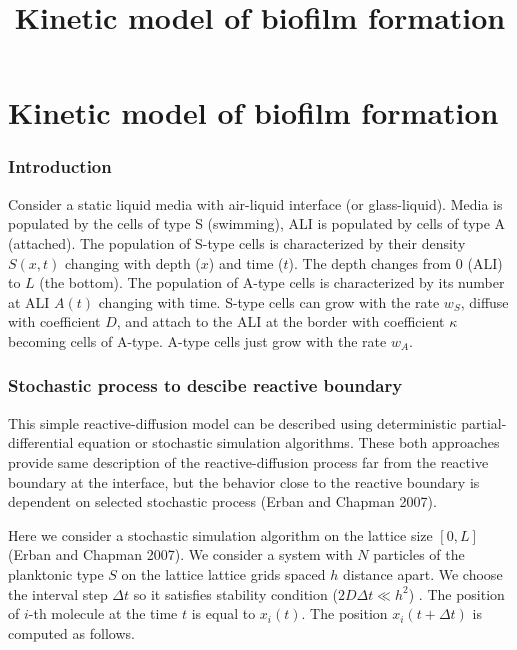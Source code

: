 \documentclass[10pt, oneside]{article}
\title {Kinetic model of biofilm formation}
\begin{document}
\linenumbers

\maketitle

\tableofcontents
\clearpage
%


\part{Kinetic model of biofilm formation}\section{Introduction}

Consider a static liquid media with air-liquid interface (or glass-liquid).
Media is populated by the cells of type S (swimming), ALI is populated by cells of type A (attached).
The population of S-type cells is characterized by their density $S(x,t)$ changing with depth ($x$) and time ($t$).
The depth changes from $0$ (ALI) to $L$ (the bottom).
The population of A-type cells is characterized by its number at ALI $A(t)$ changing with time.
S-type cells can grow with the rate $w_S$, diffuse with coefficient $D$, and attach to the ALI at the border with coefficient $\kappa$ becoming cells of A-type.
A-type cells just grow with the rate $w_A$.

\section{Stochastic process to descibe reactive boundary }
This simple reactive-diffusion model can be described using deterministic partial-differential equation or stochastic simulation algorithms. These both approaches provide same description of the reactive-diffusion process far from the reactive boundary at the interface, but the behavior close to the reactive boundary is dependent on selected stochastic process (Erban and Chapman 2007). \par
Here we consider a stochastic simulation algorithm on the lattice size $[0,L]$ (Erban and Chapman 2007). We consider a system with $N$ particles of the planktonic type $S$ on the lattice lattice grids spaced $h$ distance apart. We choose the interval step $\Delta t$ so it satisfies stability condition ($ 2D\Delta t\ll h^{2}$) . The position of $i$-th molecule at the time $t$ is equal to $x_i (t)$. The position $x_i (t+\Delta t)$  is computed as follows.
\end{document}
